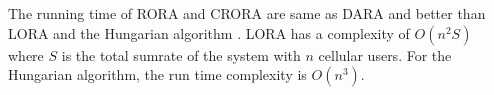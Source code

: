 \documentclass[times]{dacauth}
\begin{document}
\noindent
The running time of RORA and CRORA are same as DARA \cite{dara} and better than LORA \cite{lora} and the Hungarian algorithm \cite{hungarian}. LORA has a complexity of  $O(n^2S)$ where $S$ is the total sumrate of the system with $n$ cellular users. For the Hungarian algorithm, the run time complexity is  $O(n^3)$.





\end{document}
